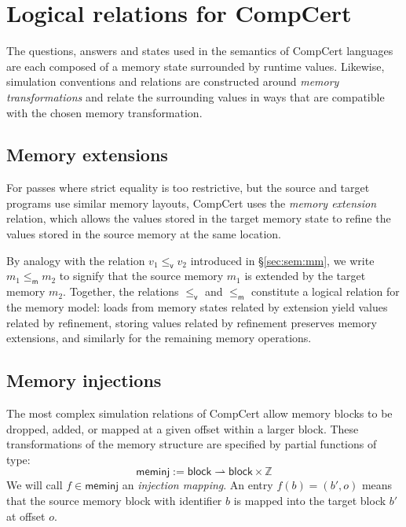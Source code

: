 \documentclass[sigplan,screen]{acmart}
\newcommand{\kw}[1]{\ensuremath{ \mathsf{#1} }}
\newcommand{\vref}{\le_\kw{v}}
\newcommand{\mext}{\le_\kw{m}}
\begin{document}


\section{Logical relations for CompCert} \label{sec:cklr} %

The questions, answers and states
used in the semantics of CompCert languages are each composed of
a memory state surrounded by runtime values.
Likewise, simulation conventions and relations
are constructed around \emph{memory transformations}
and relate the surrounding values in ways that
are compatible with the chosen memory transformation.

\subsection{Memory extensions} \label{sec:memext} %

For passes where strict equality is too restrictive,
but the source and target programs
use similar memory layouts,
CompCert uses the \emph{memory extension} relation,
which allows the values
stored in the target memory state to refine
the values stored in the source memory at the same location.

By analogy with
the relation $v_1 \vref v_2$
introduced in
\S\ref{sec:sem:mm},
we write $m_1 \mext m_2$ to signify that
the source memory $m_1$ is extended by
the target memory $m_2$.
Together,
the relations $\vref$ and $\mext$
constitute a logical relation for the memory model:
loads from memory states related by extension
yield values related by refinement,
storing values related by refinement
preserves memory extensions,
and similarly for the remaining memory operations.


\subsection{Memory injections} \label{sec:meminj} %

The most complex simulation relations of CompCert
allow memory blocks to be dropped, added, or
mapped at a given offset within a larger block.
These transformations of the memory structure
are specified by partial functions of type:
\[
  \kw{meminj} := \kw{block} \rightharpoonup \kw{block} \times \mathbb{Z}
\]
We will call $f \in \kw{meminj}$
an \emph{injection mapping}.
An entry $f(b) = (b', o)$
means that the source memory block with identifier $b$
is mapped into the target block $b'$
at offset $o$.
\end{document}
